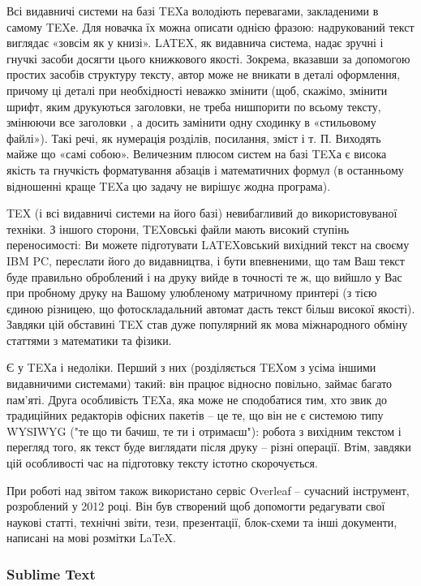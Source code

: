 Всі видавничі системи на базі TEXа володіють перевагами, закладеними в самому TEXе. Для новачка їх можна описати однією фразою: надрукований текст виглядає «зовсім як у книзі». LATEX, як видавнича система, надає зручні і гнучкі засоби досягти цього книжкового якості. Зокрема, вказавши за допомогою простих засобів структуру тексту, автор може не вникати в деталі оформлення, причому ці деталі при необхідності неважко змінити (щоб, скажімо, змінити шрифт, яким друкуються заголовки, не треба нишпорити по всьому тексту, змінюючи все заголовки , а досить замінити одну сходинку в «стильовому файлі»). Такі речі, як нумерація розділів, посилання, зміст і т. П. Виходять майже що «самі собою». Величезним плюсом систем на базі TEXа є висока якість та гнучкість форматування абзаців і математичних формул (в останньому відношенні краще TEXа цю задачу не вирішує жодна програма).

TEX (і всі видавничі системи на його базі) невибагливий до використовуваної техніки. З іншого сторони, TEXовські файли мають високий ступінь переносимості: Ви можете підготувати LATEXовський вихідний текст на своєму IBM PC, переслати його до видавництва, і бути впевненими, що там Ваш текст буде правильно оброблений і на друку вийде в точності те ж, що вийшло у Вас при пробному друку на Вашому улюбленому матричному принтері (з тією єдиною різницею, що фотоскладальний автомат дасть текст більш високої якості). Завдяки цій обставині TEX став дуже популярний як мова міжнародного обміну статтями з математики та фізики.

Є у TEXа і недоліки. Перший з них (розділяється TEXом з усіма іншими видавничими системами) такий: він працює відносно повільно, займає багато пам'яті. Друга особливість TEXа, яка може не сподобатися тим, хто звик до традиційних редакторів офісних пакетів -- це те, що він не є системою типу WYSIWYG ("те що ти бачиш, те ти і отримаєш"): робота з вихідним текстом і перегляд того, як текст буде виглядати після друку -- різні операції. Втім, завдяки цій особливості час на підготовку тексту істотно скорочується.

При роботі над звітом також використано сервіс Overleaf -- сучасний інструмент, розроблений у 2012 році. Він був створений щоб допомогти редагувати свої наукові статті, технічні звіти, тези, презентації, блок-схеми та інші документи, написані на мові розмітки LaTeX. 

\subsubsection{Sublime Text}

